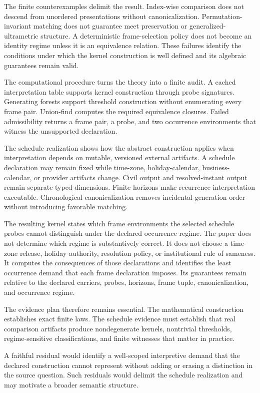 \documentclass[11pt]{article}
\theoremstyle{plain}
\theoremstyle{definition}
\theoremstyle{remark}
\begin{document}
The finite counterexamples delimit the result.
Index-wise comparison does not descend
from unordered presentations
without canonicalization.
Permutation-invariant matching
does not guarantee
meet preservation
or generalized-ultrametric structure.
A deterministic frame-selection policy
does not become an identity regime
unless it is an equivalence relation.
These failures identify the conditions
under which the kernel construction
is well defined and its algebraic guarantees remain valid.

The computational procedure turns the theory into a finite audit.
A cached interpretation table supports kernel construction
through probe signatures.
Generating forests support threshold construction
without enumerating every frame pair.
Union-find computes the required equivalence closures.
Failed admissibility returns a frame pair,
a probe, and two occurrence environments
that witness the unsupported declaration.

The schedule realization shows how the abstract construction
applies when interpretation depends
on mutable, versioned external artifacts.
A schedule declaration may remain fixed
while time-zone,
holiday-calendar,
business-calendar,
or provider artifacts change.
Civil output and resolved-instant output remain separate typed dimensions.
Finite horizons make recurrence interpretation executable.
Chronological canonicalization removes incidental generation order
without introducing favorable matching.

The resulting kernel states which frame environments
the selected schedule probes cannot distinguish
under the declared occurrence regime.
The paper does not determine
which regime is substantively correct.
It does not choose a time-zone release,
holiday authority,
resolution policy,
or institutional rule of sameness.
It computes the consequences
of those declarations
and identifies the least occurrence demand
that each frame declaration imposes.
Its guarantees remain relative
to the declared carriers,
probes,
horizons,
frame tuple,
canonicalization,
and occurrence regime.

The evidence plan therefore remains essential.
The mathematical construction establishes exact finite laws.
The schedule evidence must establish that real comparison artifacts
produce nondegenerate kernels, nontrivial thresholds,
regime-sensitive classifications, and finite witnesses
that matter in practice.

A faithful residual would identify a well-scoped interpretive demand
that the declared construction cannot represent
without adding or erasing a distinction in the source question.
Such residuals would delimit the schedule realization
and may motivate a broader semantic structure.
\end{document}
